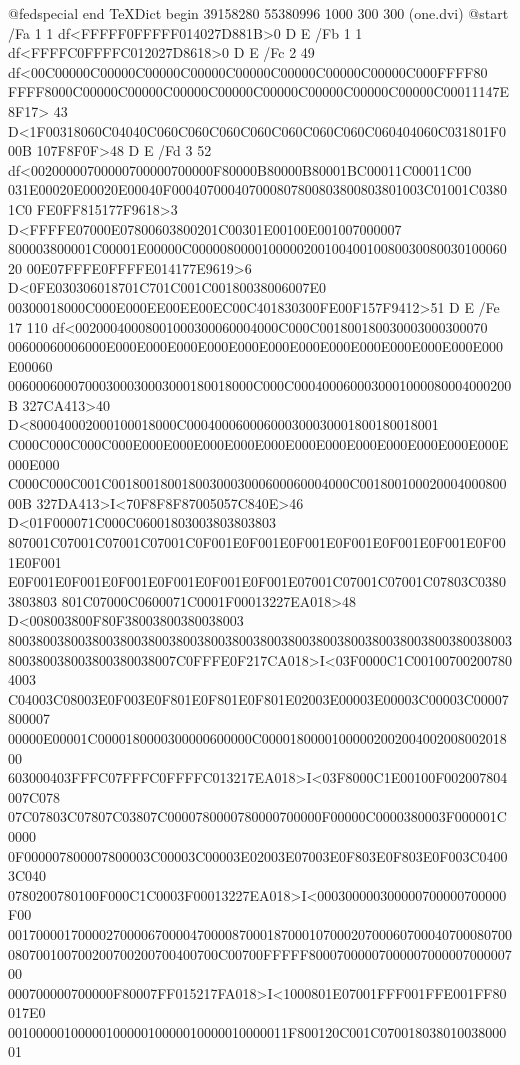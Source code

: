 @fedspecial end TeXDict begin
39158280 55380996 1000 300 300 (one.dvi) @start
/Fa 1 1 df<FFFFF0FFFFF014027D881B>0 D E
/Fb 1 1 df<FFFFC0FFFFC012027D8618>0 D E
/Fc 2 49 df<00C00000C00000C00000C00000C00000C00000C00000C00000C000FFFF80
FFFF8000C00000C00000C00000C00000C00000C00000C00000C00000C00011147E8F17>
43 D<1F00318060C04040C060C060C060C060C060C060C060C060404060C031801F000B
107F8F0F>48 D E
/Fd 3 52 df<00200000700000700000700000F80000B80000B80001BC00011C00011C00
031E00020E00020E00040F000407000407000807800803800803801003C01001C03801C0
FE0FF815177F9618>3 D<FFFFE07000E07800603800201C00301E00100E001007000007
800003800001C00001E00000C00000800001000002001004001008003008003010006020
00E07FFFE0FFFFE014177E9619>6 D<0FE030306018701C701C001C00180038006007E0
00300018000C000E000EE00EE00EC00C401830300FE00F157F9412>51
D E
/Fe 17 110 df<00200040008001000300060004000C000C001800180030003000300070
00600060006000E000E000E000E000E000E000E000E000E000E000E000E000E000E00060
00600060007000300030003000180018000C000C0004000600030001000080004000200B
327CA413>40 D<800040002000100018000C000400060006000300030001800180018001
C000C000C000C000E000E000E000E000E000E000E000E000E000E000E000E000E000E000
C000C000C001C0018001800180030003000600060004000C00180010002000400080000B
327DA413>I<70F8F8F87005057C840E>46 D<01F000071C000C06001803003803803803
807001C07001C07001C07001C0F001E0F001E0F001E0F001E0F001E0F001E0F001E0F001
E0F001E0F001E0F001E0F001E0F001E0F001E07001C07001C07001C07803C03803803803
801C07000C0600071C0001F00013227EA018>48 D<008003800F80F38003800380038003
800380038003800380038003800380038003800380038003800380038003800380038003
800380038003800380038007C0FFFE0F217CA018>I<03F0000C1C001007002007804003
C04003C08003E0F003E0F801E0F801E0F801E02003E00003E00003C00003C00007800007
00000E00001C0000180000300000600000C0000180000100000200200400200800201800
603000403FFFC07FFFC0FFFFC013217EA018>I<03F8000C1E00100F002007804007C078
07C07803C07807C03807C0000780000780000700000F00000C0000380003F000001C0000
0F000007800007800003C00003C00003E02003E07003E0F803E0F803E0F003C04003C040
0780200780100F000C1C0003F00013227EA018>I<000300000300000700000700000F00
001700001700002700006700004700008700018700010700020700060700040700080700
080700100700200700200700400700C00700FFFFF8000700000700000700000700000700
000700000700000F80007FF015217FA018>I<1000801E07001FFF001FFE001FF80017E0
0010000010000010000010000010000010000011F800120C001C07001803801003800001
